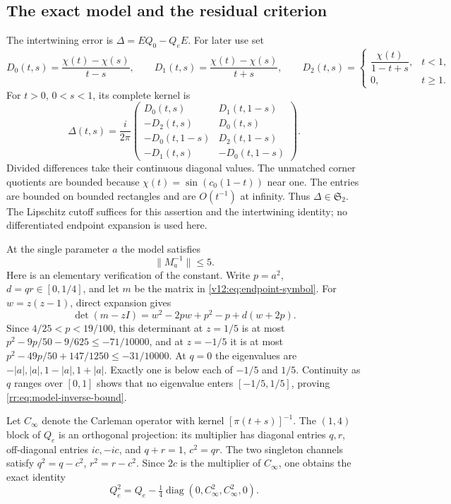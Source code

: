 \subsection{The exact model and the residual criterion}

The intertwining error is $\Delta=EQ_0-Q_eE$.  For later use set
\[
 D_0(t,s)=\frac{\chi(t)-\chi(s)}{t-s},\qquad
 D_1(t,s)=\frac{\chi(t)-\chi(s)}{t+s},\qquad
 D_2(t,s)=\begin{cases}\dfrac{\chi(t)}{1-t+s},&t<1,\\0,&t\ge1.
 \end{cases}
\]
For $t>0$, $0<s<1$, its complete kernel is
\begin{equation}\label{rr:eq:cosine-defect}
 \Delta(t,s)=\frac{i}{2\pi}
 \begin{pmatrix}
 D_0(t,s)&D_1(t,1-s)\\
 -D_2(t,s)&D_0(t,s)\\
 -D_0(t,1-s)&D_2(t,1-s)\\
 -D_1(t,s)&-D_0(t,1-s)
 \end{pmatrix}.
\end{equation}
Divided differences take their continuous diagonal values.  The unmatched
corner quotients are bounded because $\chi(t)=\sin(c_0(1-t))$ near one.
The entries are bounded on bounded rectangles and are $O(t^{-1})$ at
infinity.  Thus $\Delta\in\mathfrak S_2$.  The Lipschitz cutoff suffices
for this assertion and the intertwining identity; no differentiated
endpoint expansion is used here.

At the single parameter $a$ the model satisfies
\begin{equation}\label{rr:eq:model-inverse-bound}
 \|M_a^{-1}\|\le5.
\end{equation}
Here is an elementary verification of the constant.  Write $p=a^2$,
$d=qr\in[0,1/4]$, and let $m$ be the matrix in
\eqref{v12:eq:endpoint-symbol}.  For $w=z(z-1)$, direct expansion gives
\[
 \det(m-zI)=w^2-2pw+p^2-p+d(w+2p).
\]
Since $4/25<p<19/100$, this determinant at $z=1/5$ is at most
$p^2-9p/50-9/625\le-71/10000$, and at $z=-1/5$ it is at most
$p^2-49p/50+147/1250\le-31/10000$.
At $q=0$ the eigenvalues are $-|a|,|a|,1-|a|,1+|a|$.
Exactly one is below each of $-1/5$ and $1/5$.
Continuity as $q$ ranges over $[0,1]$ shows that no eigenvalue enters
$[-1/5,1/5]$, proving \eqref{rr:eq:model-inverse-bound}.

Let $C_\infty$ denote the Carleman operator with kernel
$[\pi(t+s)]^{-1}$.  The $(1,4)$ block of $Q_e$ is an orthogonal
projection: its multiplier has diagonal entries $q,r$, off-diagonal
entries $ic,-ic$, and $q+r=1$, $c^2=qr$.
The two singleton channels satisfy $q^2=q-c^2$, $r^2=r-c^2$.
Since $2c$ is the multiplier of $C_\infty$, one obtains the exact identity
\begin{equation}\label{rr:eq:model-square}
 Q_e^2=Q_e-\tfrac14\operatorname{diag}
                    (0,C_\infty^2,C_\infty^2,0).
\end{equation}


